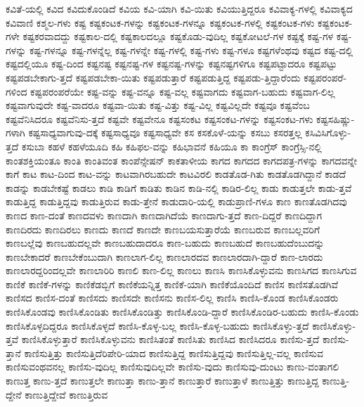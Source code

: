 {ಕವಿತೆ-ಯಲ್ಲಿ
ಕವಿದ
ಕವಿದುಕೊಂಡಿದೆ
ಕವಿಯ
ಕವಿ-ಯಾಗಿ
ಕವಿ-ಯಿತು
ಕವಿಯುತ್ತಿದ್ದರೂ
ಕವಿವಾಕ್ಯ-ಗಳಲ್ಲಿ
ಕವಿವಾಕ್ಯದ
ಕವಿವಾಣಿ
ಕಶ್ಮಲ-ಗಳು
ಕಷ್ಟ
ಕಷ್ಟಕಂಟಕ-ಗಳನ್ನು
ಕಷ್ಟಕಂಟಕ-ಗಳನ್ನೂ
ಕಷ್ಟಕಂಟಕ-ಗಳಲ್ಲಿ
ಕಷ್ಟಕಂಟಕ-ಗಳು
ಕಷ್ಟಕಂಟಕ-ಗಳೇ
ಕಷ್ಟಕರವಾದದ್ದು
ಕಷ್ಟಕಾಲ-ದಲ್ಲಿ
ಕಷ್ಟಕಾಲದಲ್ಲೂ
ಕಷ್ಟಕೊಡು-ವುದಿಲ್ಲ
ಕಷ್ಟಕೋಟಲೆ-ಗಳ
ಕಷ್ಟಕ್ಕೆ
ಕಷ್ಟ-ಗಳ
ಕಷ್ಟ-ಗಳನ್ನು
ಕಷ್ಟ-ಗಳನ್ನೂ
ಕಷ್ಟ-ಗಳನ್ನೆಲ್ಲ
ಕಷ್ಟ-ಗಳನ್ನೇ
ಕಷ್ಟ-ಗಳಲ್ಲಿ
ಕಷ್ಟ-ಗಳು
ಕಷ್ಟ-ಗಳೂ
ಕಷ್ಟಗಳೆಂಥವು
ಕಷ್ಟದ
ಕಷ್ಟ-ದಲ್ಲಿ
ಕಷ್ಟದಲ್ಲಿಯೂ
ಕಷ್ಟ-ದಿಂದ
ಕಷ್ಟನಷ್ಟ
ಕಷ್ಟನಷ್ಟ-ಗಳ
ಕಷ್ಟನಷ್ಟ-ಗಳನ್ನು
ಕಷ್ಟನಷ್ಟಗಳಿಗೂ
ಕಷ್ಟಪಟ್ಟಾದರೂ
ಕಷ್ಟಪಟ್ಟು
ಕಷ್ಟಪಡಬೇಕಾಗು-ತ್ತದೆ
ಕಷ್ಟಪಡಬೇಕಾ-ಯಿತು
ಕಷ್ಟಪಡುತ್ತಾರೆ
ಕಷ್ಟಪಡುತ್ತಿದ್ದ
ಕಷ್ಟಪಡು-ತ್ತಿದ್ದಾರೆಂದು
ಕಷ್ಟಪರಂಪರೆ-ಗಳಿಂದ
ಕಷ್ಟಪರಂಪರೆಯೇ
ಕಷ್ಟ-ವನ್ನು
ಕಷ್ಟ-ವನ್ನೂ
ಕಷ್ಟ-ವಲ್ಲ
ಕಷ್ಟವಾಗದು
ಕಷ್ಟವಾಗ-ಬಹುದು
ಕಷ್ಟವಾಗ-ಲಿಲ್ಲ
ಕಷ್ಟವಾಗುವುದೇ
ಕಷ್ಟ-ವಾದರೂ
ಕಷ್ಟವಾ-ಯಿತು
ಕಷ್ಟ-ವಿತ್ತು
ಕಷ್ಟ-ವಿಲ್ಲ
ಕಷ್ಟವಿಲ್ಲದೇ
ಕಷ್ಟವೂ
ಕಷ್ಟವೆಂಬ
ಕಷ್ಟವೆನಿಸಿದರೂ
ಕಷ್ಟವೆನಿಸು-ತ್ತದೆ
ಕಷ್ಟವೇ
ಕಷ್ಟವೇನೂ
ಕಷ್ಟಸಂಕಟ
ಕಷ್ಟಸಂಕಟ-ಗಳನ್ನು
ಕಷ್ಟಸಂಕಟ-ಗಳು
ಕಷ್ಟಸಹಿಷ್ಣು-ಗಳಾಗಿ
ಕಷ್ಟಸಾಧ್ಯವಾಗುವು-ದಕ್ಕೆ
ಕಷ್ಟಸಾಧ್ಯವೂ
ಕಷ್ಟಸಾಧ್ಯವೇ
ಕಸ
ಕಸಕೊಳೆ-ಯನ್ನು
ಕಸಬು
ಕಸರತ್ತಲ್ಲ
ಕಸಿವಿಸಿಗೊಳ್ಳು-ತ್ತದೆ
ಕಸುಬಾ
ಕಹಳೆ
ಕಹಳೆಯೂದಿ
ಕಹಿ
ಕಹಿಫಲ-ವನ್ನು
ಕಹಿಭಾವನೆ
ಕಹಿಯೂ
ಕಾ
ಕಾಂಗ್ರೆಸ್
ಕಾಂಗ್ರೆಸ್ಸಿ-ನಲ್ಲಿ
ಕಾಂತಶಕ್ತಿಯಂತೂ
ಕಾಂತಿ
ಕಾಂತಿವಂತ
ಕಾಂಪೆನ್ಸೇಷನ್
ಕಾಕತಾಳೀಯ
ಕಾಗದ
ಕಾಗದದ
ಕಾಗದಪತ್ರ-ಗಳನ್ನು
ಕಾಗದವನ್ನೇ
ಕಾಗೆ
ಕಾಟ
ಕಾಟ-ದಿಂದ
ಕಾಟ-ವನ್ನು
ಕಾಟವಾಗಿರಬಹುದೇ
ಕಾಟವಿರಲಿ
ಕಾಡತೊಡ-ಗಿತು
ಕಾಡತೊಡಗಿದ್ದಾನೆ
ಕಾಡದೆ
ಕಾಡನ್ನು
ಕಾಡಬೇಕಷ್ಟೆ
ಕಾಡಲು
ಕಾಡಿ
ಕಾಡಿಗೆ
ಕಾಡಿತು
ಕಾಡಿನ
ಕಾಡಿ-ನಲ್ಲಿ
ಕಾಡಿರ-ಲಿಲ್ಲ
ಕಾಡು
ಕಾಡುತ್ತಲೇ
ಕಾಡು-ತ್ತವೆ
ಕಾಡುತ್ತಿದ್ದ
ಕಾಡುತ್ತಿದ್ದವು
ಕಾಡುತ್ತಿರುವ
ಕಾಡು-ತ್ತೇನೆ
ಕಾಡುದಾರಿ-ಯಲ್ಲಿ
ಕಾಡುಪ್ರಾಣಿ-ಗಳೂ
ಕಾಣ
ಕಾಣತೊಡಗಿದವು
ಕಾಣದ
ಕಾಣ-ದಂತೆ
ಕಾಣದವಳು
ಕಾಣದಾಗಿ
ಕಾಣದಾಗಿದೆಯೆ
ಕಾಣದಾಗು-ತ್ತದೆ
ಕಾಣ-ದಿದ್ದರೆ
ಕಾಣದಿದ್ದಾಗ
ಕಾಣದಿರದು
ಕಾಣದಿರಲು
ಕಾಣದು
ಕಾಣದೆ
ಕಾಣದೇ
ಕಾಣಬಯಸುತ್ತಾರೆಯೆ
ಕಾಣಬರುವ
ಕಾಣಬಲ್ಲವರಿಗೆ
ಕಾಣಬಲ್ಲೆವು
ಕಾಣಬಹುದಲ್ಲವೇ
ಕಾಣಬಹುದಾದರೂ
ಕಾಣ-ಬಹುದು
ಕಾಣಬಹುದೆ
ಕಾಣಬಹುದೆಂಬುದನ್ನು
ಕಾಣಬೇಕಾದರೆ
ಕಾಣಬೇಕೆಂಬುದಾಗಿ
ಕಾಣಲಾಗ-ಲಿಲ್ಲ
ಕಾಣಲಾರದವ
ಕಾಣಲಾರದಾಗಿ-ದ್ದಾರೆ
ಕಾಣ-ಲಾರದು
ಕಾಣಲಾರದ್ದರಿಂದಲ್ಲವೇ
ಕಾಣಲಾರಿರಿ
ಕಾಣಲಿ
ಕಾಣ-ಲಿಲ್ಲ
ಕಾಣಲು
ಕಾಣಸಿ
ಕಾಣಸಿಕೊಳ್ಳುವನು
ಕಾಣಸಿಗದ
ಕಾಣಸಿಗುವ
ಕಾಣಿಕೆ
ಕಾಣಿಕೆ-ಗಳನ್ನು
ಕಾಣಿಕೆಡಬ್ಬಿಗೆ
ಕಾಣಿಕೆಯನ್ನಿತ್ತ
ಕಾಣಿಕೆ-ಯಾಗಿ
ಕಾಣಿಕೆಯೊಂದಿದೆ
ಕಾಣಿಸ
ಕಾಣಿಸತೊಡಗಿವೆ
ಕಾಣಿಸದ
ಕಾಣಿಸ-ದಂತೆ
ಕಾಣಿಸದು
ಕಾಣಿಸದೇ
ಕಾಣಿಸನು
ಕಾಣಿಸ-ಲಿಲ್ಲ
ಕಾಣಿಸಿ
ಕಾಣಿಸಿ-ಕೊಂಡ
ಕಾಣಿಸಿಕೊಂಡರು
ಕಾಣಿಸಿಕೊಂಡವು
ಕಾಣಿಸಿಕೊಂಡಿತು
ಕಾಣಿಸಿಕೊಂಡಿತ್ತು
ಕಾಣಿಸಿಕೊಂಡಿ-ದ್ದಾರೆ
ಕಾಣಿಸಿಕೊಂಡಿರ-ಬಹುದು
ಕಾಣಿಸಿ-ಕೊಂಡು
ಕಾಣಿಸಿಕೊಳ್ಳದಿದ್ದರೂ
ಕಾಣಿಸಿಕೊಳ್ಳದೆ
ಕಾಣಿಸಿ-ಕೊಳ್ಳ-ಬಲ್ಲ
ಕಾಣಿಸಿ-ಕೊಳ್ಳ-ಬಹುದು
ಕಾಣಿಸಿಕೊಳ್ಳು-ತ್ತದೆ
ಕಾಣಿಸಿಕೊಳ್ಳು-ತ್ತವೆ
ಕಾಣಿಸಿಕೊಳ್ಳುತ್ತಾರೆ
ಕಾಣಿಸಿಕೊಳ್ಳುವನು
ಕಾಣಿಸಿತಂತೆ
ಕಾಣಿಸಿತು
ಕಾಣಿಸಿದ
ಕಾಣಿಸಿದರೂ
ಕಾಣಿಸು-ತ್ತದೆ
ಕಾಣಿಸು-ತ್ತಾನೆ
ಕಾಣಿಸುತ್ತಿತ್ತು
ಕಾಣಿಸುತ್ತಿದೆರಿಪೇರಿ-ಯಾದ
ಕಾಣಿಸುತ್ತಿದ್ದ
ಕಾಣಿಸುತ್ತಿದ್ದವು
ಕಾಣಿಸುತ್ತಿಲ್ಲ-ವಲ್ಲ
ಕಾಣಿಸುವ
ಕಾಣಿಸುವಂಥವನಲ್ಲ
ಕಾಣಿಸು-ವುದಿಲ್ಲ
ಕಾಣಿಸುವುದಿಲ್ಲವೇ
ಕಾಣಿಸು-ವುದು
ಕಾಣಿಸುವು-ದುಂಟು
ಕಾಣು-ವಂತಾಗಲಿ
ಕಾಣುತ್ತ
ಕಾಣು-ತ್ತದೆ
ಕಾಣುತ್ತಲೇ
ಕಾಣುತ್ತಾ
ಕಾಣು-ತ್ತಾನೆ
ಕಾಣುತ್ತಾರೆ
ಕಾಣುತ್ತಾಳೆ
ಕಾಣುತ್ತಿತ್ತು
ಕಾಣುತ್ತಿದ್ದ
ಕಾಣುತ್ತಿ-ದ್ದೇನೆ
ಕಾಣುತ್ತಿದ್ದೇವೆ
ಕಾಣುತ್ತಿರುವ
}
